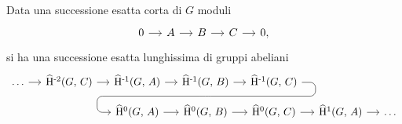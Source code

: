 \begin{theorem}\label{fond2}
	Data una successione esatta corta di $ G $ moduli
	\[\begin{tikzcd}[column sep = small]
	0 \rar & A \rar & B \rar & C \rar & 0,
	\end{tikzcd}\]
	si ha una successione esatta lunghissima di gruppi abeliani
	\[\begin{tikzcd}[column sep = small, row sep = small]
	\dots \rar & \Hhmm(G, \, C) \rar &\Hhm(G, \, A) \rar & \Hhm(G, \, B) \arrow[d,phantom, ""{coordinate, name=W}] \rar & \Hhm(G, \, C) \arrow[dll, 
	rounded corners = 5 pt, 
	to path={ --([xshift=3ex]\tikztostart.east)
		|- (W)[near end]\tikztonodes
		-| ([xshift=-3ex]\tikztotarget.west)
		-- (\tikztotarget)}] && \\
	&&\Hhz(G, \, A) \rar & \Hhz(G, \, B) \rar & \Hhz(G, \, C) \rar
	 & \Hhu(G, \, A) \rar & \dots \end{tikzcd}\]
\end{theorem}
